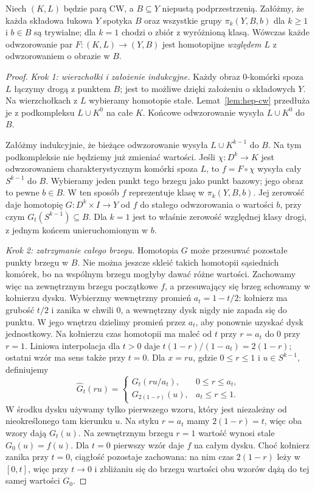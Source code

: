 \begin{lemat}
\label{lem:kompresja-cw}
Niech $(K,L)$ będzie parą CW, a $B\subseteq Y$ niepustą
podprzestrzenią. Załóżmy, że każda składowa łukowa $Y$ spotyka $B$
oraz wszystkie grupy $\pi_k(Y,B,b)$ dla $k\geq1$ i $b\in B$
są trywialne; dla $k=1$ chodzi o zbiór z wyróżnioną klasą.
Wówczas każde odwzorowanie par $F:(K,L)\to(Y,B)$ jest homotopijne
\emph{względem $L$} z odwzorowaniem o obrazie w $B$.
\end{lemat}
\begin{proof}
\emph{Krok 1: wierzchołki i założenie indukcyjne.}
Każdy obraz $0$-komórki spoza $L$ łączymy drogą z punktem $B$;
jest to możliwe dzięki założeniu o składowych $Y$.
Na wierzchołkach z $L$ wybieramy homotopie stałe.
Lemat~\ref{lem:hep-cw} przedłuża je z podkompleksu $L\cup K^0$
na całe $K$. Końcowe odwzorowanie wysyła $L\cup K^0$ do $B$.

Załóżmy indukcyjnie, że bieżące odwzorowanie wysyła
$L\cup K^{k-1}$ do $B$. Na tym podkompleksie nie będziemy
już zmieniać wartości. Jeśli $\chi:D^k\to K$ jest odwzorowaniem
charakterystycznym komórki spoza $L$, to $f=F\circ\chi$
wysyła cały $S^{k-1}$ do $B$. Wybieramy jeden punkt tego brzegu
jako punkt bazowy; jego obraz to pewne $b\in B$.
W ten sposób $f$ reprezentuje klasę w $\pi_k(Y,B,b)$.
Jej zerowość daje homotopię $G:D^k\times I\to Y$ od $f$
do stałego odwzorowania o wartości $b$, przy czym
$G_t(S^{k-1})\subseteq B$. Dla $k=1$ jest to właśnie
zerowość względnej klasy drogi, z jednym końcem unieruchomionym w $b$.

\emph{Krok 2: zatrzymanie całego brzegu.}
Homotopia $G$ może przesuwać pozostałe punkty brzegu w $B$.
Nie można jeszcze skleić takich homotopii sąsiednich komórek,
bo na wspólnym brzegu mogłyby dawać różne wartości.
Zachowamy więc na zewnętrznym brzegu początkowe $f$,
a przesuwający się brzeg schowamy w kołnierzu dysku.
Wybierzmy wewnętrzny promień $a_t=1-t/2$:
kołnierz ma grubość $t/2$ i zanika w chwili $0$,
a wewnętrzny dysk nigdy nie zapada się do punktu.
W jego wnętrzu dzielimy promień przez $a_t$, aby ponownie
uzyskać dysk jednostkowy. Na kołnierzu czas homotopii
ma maleć od $t$ przy $r=a_t$ do $0$ przy $r=1$.
Liniowa interpolacja dla $t>0$ daje
$t(1-r)/(1-a_t)=2(1-r)$; ostatni wzór ma sens także przy $t=0$.
Dla $x=ru$, gdzie $0\leq r\leq1$
i $u\in S^{k-1}$, definiujemy
\[
 \widehat G_t(ru)=
 \begin{cases}
 G_t(ru/a_t),&0\leq r\leq a_t,\\
 G_{2(1-r)}(u),&a_t\leq r\leq1.
 \end{cases}
\]
W środku dysku używamy tylko pierwszego wzoru,
który jest niezależny od nieokreślonego tam kierunku $u$.
Na styku $r=a_t$ mamy $2(1-r)=t$, więc oba wzory dają $G_t(u)$.
Na zewnętrznym brzegu $r=1$ wartość wynosi stale $G_0(u)=f(u)$.
Dla $t=0$ pierwszy wzór daje $f$ na całym dysku.
Choć kołnierz zanika przy $t=0$, ciągłość pozostaje zachowana:
na nim czas $2(1-r)$ leży w $[0,t]$, więc przy $t\to0$
i zbliżaniu się do brzegu wartości obu wzorów dążą do tej samej
wartości $G_0$.


\end{proof}
